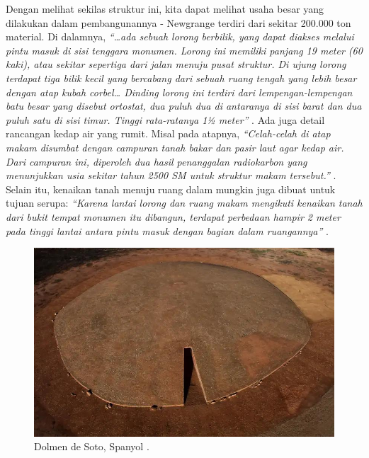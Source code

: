 \documentclass[10pt,twocolumn,letterpaper]{article}
\begin{document}
Dengan melihat sekilas struktur ini, kita dapat melihat usaha besar yang dilakukan dalam pembangunannya - Newgrange terdiri dari sekitar 200.000 ton material. Di dalamnya, \textit{“…ada sebuah lorong berbilik, yang dapat diakses melalui pintu masuk di sisi tenggara monumen. Lorong ini memiliki panjang 19 meter (60 kaki), atau sekitar sepertiga dari jalan menuju pusat struktur. Di ujung lorong terdapat tiga bilik kecil yang bercabang dari sebuah ruang tengah yang lebih besar dengan atap kubah corbel… Dinding lorong ini terdiri dari lempengan-lempengan batu besar yang disebut ortostat, dua puluh dua di antaranya di sisi barat dan dua puluh satu di sisi timur. Tinggi rata-ratanya 1½ meter”} \cite{70}. Ada juga detail rancangan kedap air yang rumit. Misal pada atapnya, \textit{“Celah-celah di atap makam disumbat dengan campuran tanah bakar dan pasir laut agar kedap air. Dari campuran ini, diperoleh dua hasil penanggalan radiokarbon yang menunjukkan usia sekitar tahun 2500 SM untuk struktur makam tersebut.”} \cite{71}. Selain itu, kenaikan tanah menuju ruang dalam mungkin juga dibuat untuk tujuan serupa: \textit{“Karena lantai lorong dan ruang makam mengikuti kenaikan tanah dari bukit tempat monumen itu dibangun, terdapat perbedaan hampir 2 meter pada tinggi lantai antara pintu masuk dengan bagian dalam ruangannya”} \cite{71}.

\begin{figure}[b]
\begin{center}
   \includegraphics[width=1\linewidth]{dolmen.jpg}
\end{center}
   \caption{Dolmen de Soto, Spanyol \cite{53}.}
\label{fig:9}
\label{fig:onecol}
\end{figure}
\end{document}
